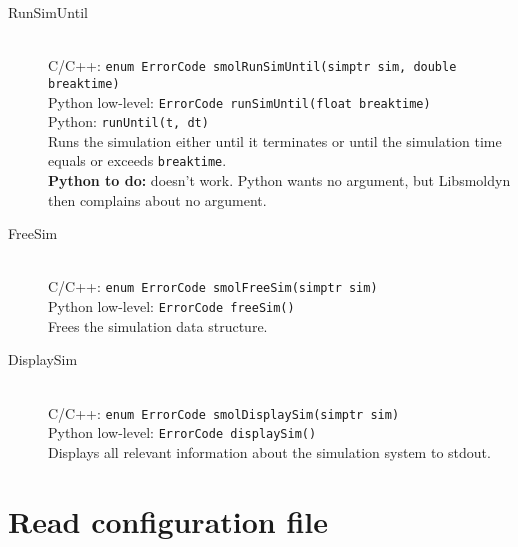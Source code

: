 \documentclass {book}
\newcommand {\ttt} {\texttt}
\begin{document}
\begin{description}
\item[RunSimUntil]
\hfill \\
C/C++: \ttt{enum ErrorCode smolRunSimUntil(simptr sim, double breaktime)}\\
Python low-level: \ttt{ErrorCode runSimUntil(float breaktime)}\\
Python: \ttt{runUntil(t, dt)}\\
Runs the simulation either until it terminates or until the simulation time equals or exceeds \ttt{breaktime}.\\
\textbf{Python to do:} doesn't work. Python wants no argument, but Libsmoldyn then complains about no argument.

\item[FreeSim]
\hfill \\
C/C++: \ttt{enum ErrorCode smolFreeSim(simptr sim)}\\
Python low-level: \ttt{ErrorCode freeSim()}\\
Frees the simulation data structure.

\item[DisplaySim]
\hfill \\
C/C++: \ttt{enum ErrorCode smolDisplaySim(simptr sim)}\\
Python low-level: \ttt{ErrorCode displaySim()}\\
Displays all relevant information about the simulation system to stdout.

\end{description}

\section{Read configuration file}
\end{document}
